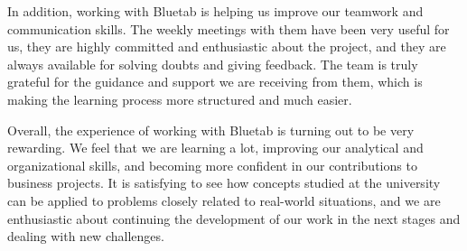 \documentclass[12pt]{report} %
\begin{document}
In addition, working with Bluetab is helping us improve our teamwork and communication skills. The weekly meetings with them have been very useful for us, they are highly committed and enthusiastic about the project, and they are always available for solving doubts and giving feedback. The team is truly grateful for the guidance and support we are receiving from them, which is making the learning process more structured and much easier. 

Overall, the experience of working with Bluetab is turning out to be very rewarding. We feel that we are learning a lot, improving our analytical and organizational skills, and becoming more confident in our contributions to business projects. It is satisfying to see how concepts studied at the university can be applied to problems closely related to real-world situations, and we are enthusiastic about continuing the development of our work in the next stages and dealing with new challenges. 









\end{document}
